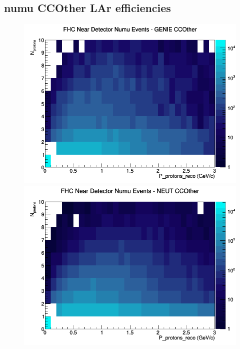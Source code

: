 \subsection{numu CCOther LAr efficiencies}
\begin{figure}[h]
\includegraphics[width=\linewidth]{eff_N_P/LAr/protons/CCOther_FHC_ND_numu_N_P_GENIE.png}
\endminipage
{}
\includegraphics[width=\linewidth]{eff_N_P/LAr/protons/CCOther_FHC_ND_numu_N_P_NEUT.png}
\endminipage
{}

\end{figure}
